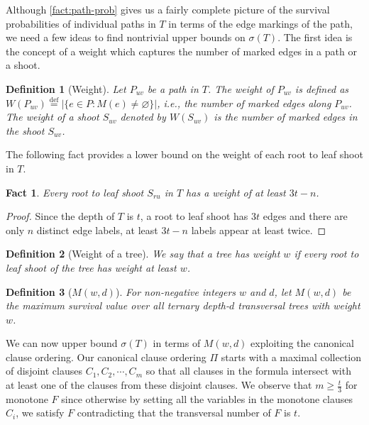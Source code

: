 \documentclass[10pt,a4paper]{article}
\let\emptyset\varnothing
\newcommand{\eqdef}{\stackrel{\textrm{def}}{=}}
\newtheorem{fact}{Fact}
\newtheorem{definition}{Definition}
\newcommand{\total}{\sigma}
\begin{document}
Although \cref{fact:path-prob} gives us a fairly complete picture of 
the survival probabilities of individual paths in $T$ in terms of the edge
markings of the path,  we need a few ideas to find nontrivial upper bounds on $\total(T)$.
The first idea is the concept of a weight which captures the number of 
marked edges in a path or a shoot. 

\begin{definition}[Weight]
Let $P_{uv}$ be a path in $T$. 
The \emph{weight} of $P_{uv}$ is defined as 
$W(P_{uv}) \eqdef |\{e \in P: M(e) \ne \emptyset \}|$, 
i.e., the number of marked edges along $P_{uv}$. 
The \emph{weight} of a shoot $S_{uv}$ denoted by $W(S_{uv})$ is the number of marked edges 
in the shoot $S_{uv}$.

\end{definition}

The following fact provides a lower bound on the weight of each root to leaf
shoot  in $T$.

\begin{fact}
\label{fact:shoot-extended-weight-lower-bound}
Every root to leaf shoot $S_{ru}$ in $T$ has a weight of
at least $3t - n$.
\end{fact}


\begin{proof}
Since the depth of $T$ is $t$,
a root to leaf shoot has $3t$ edges and there are only $n$ distinct 
edge labels, at least $3t - n$ labels appear at least twice.
\end{proof}

\begin{definition}[Weight of a tree]
We say that a tree has weight $w$ if every root to leaf shoot of the tree has weight at least $w$.
\end{definition}

\begin{definition}[$M(w, d)$]
For non-negative integers 
$w$ and $d$, 
let $M(w, d)$ be the maximum survival value
over all ternary depth-$d$ transversal trees with weight $w$.
\end{definition}


We can now upper bound $\total(T)$ in terms of $M(w,d)$ 
exploiting the canonical clause ordering.
Our canonical clause ordering $\Pi$ starts with a 
maximal collection of disjoint clauses $C_1, C_2, \cdots, C_m$
so that all clauses in the formula intersect with at least one of the clauses from these disjoint clauses. 
We observe that $m\geq \frac{t}{3}$ for monotone $F$
since otherwise by setting all the variables in the monotone 
clauses $C_i$, we satisfy $F$ contradicting 
that the transversal number of $F$ is $t$.
\end{document}
